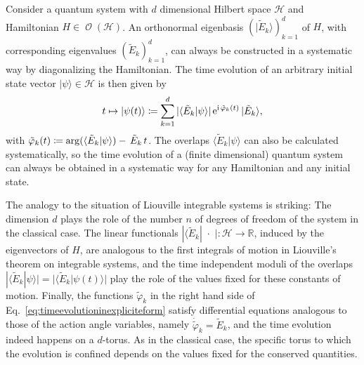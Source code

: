 \documentclass[a4paper,12pt,listof=totoc,index=totoc,bibliography=totoc,headsepline=false,headings=normal,BCOR16.153846mm,DIV12,headinclude,twoside,cleardoublepage=empty,numbers=noenddot,final]{scrreprt}
\theoremstyle{mystyle}
\numberwithin{equation}{section}
\numberwithin{figure}{section}
\numberwithin{lemma}{section}
\numberwithin{theorem}{section}
\numberwithin{corollary}{section}
\numberwithin{definition}{section}
\numberwithin{conjecture}{section}
\numberwithin{observation}{section}
\newcommand{\+}{\mkern2mu}
\newcommand{\coloneqq}{\mathrel{\vcentcolon\mkern-1.2mu=}} %
\newcommand{\texteqref}[1]{Eq.~\eqref{#1}}
\newcommand{\argdot}{{\,\cdot\,}}
\newcommand{\oftype}{\colon}
\renewcommand{\H}{H}
\newcommand{\bra}[1]{\langle #1|}
\newcommand{\ket}[1]{|#1\rangle}
\newcommand{\braket}[2]{\langle #1 | #2 \rangle}
\newcommand{\e}{\mathrm{e}}
\renewcommand{\i}{\mathrm{i}}
\DeclareMathOperator{\1}{\mathds{1}}
\DeclareMathOperator{\Obs}{\mathcal{O}}
\newcommand{\mc}[1]{\mathcal{#1}}
\newcommand{\mcH}{\mc{H}}
\newcommand{\mb}[1]{\mathbb{#1}}
\newcommand{\R}{\mb{R}}
\begin{document}
Consider a quantum system with $d$ dimensional Hilbert space $\mcH$ and Hamiltonian $\H \in \Obs(\mcH)$.
An orthonormal eigenbasis $(\ket{\tilde E_k})_{k=1}^d$ of $\H$, with corresponding eigenvalues $(\tilde E_k)_{k=1}^d$, can always be constructed in a systematic way by diagonalizing the Hamiltonian.
The time evolution of an arbitrary initial state vector $\ket \psi \in \mcH$ is then given by
\begin{equation}\label{eq:timeevolutioninexpliciteform}
  t \mapsto \ket{\psi(t)} \coloneqq \sum_{k=1}^d |\braket{\tilde E_k}{\psi}|\,\e^{\i\,\tilde\varphi_k(t)}\,\ket{\tilde E_k} ,
\end{equation}
with $\tilde\varphi_k(t) \coloneqq \arg(\braket{\tilde E_k}{\psi})-\,\tilde E_k\,t$.
The overlaps $\braket{\tilde E_k}{\psi}$ can also be calculated systematically, so the time evolution of a (finite dimensional) quantum system can always be obtained in a systematic way for any Hamiltonian and any initial state.

The analogy to the situation of Liouville integrable systems is striking:
The dimension $d$ plays the role of the number $n$ of degrees of freedom of the system in the classical case.
The linear functionals $|\bra{\tilde E_k} \,\argdot\, | \oftype \mcH \to \R$, induced by the eigenvectors of $\H$, are analogous to the first integrals of motion in Liouville's theorem on integrable systems, and the time independent moduli of the overlaps $|\braket{\tilde E_k}{\psi}| = |\braket{\tilde E_k}{\psi(t)}|$ play the role of the values fixed for these constants of motion.
Finally, the functions $\tilde \varphi_k$ in the right hand side of \texteqref{eq:timeevolutioninexpliciteform} satisfy differential equations analogous to those of the action angle variables, namely $\dot{\tilde{\varphi}}_k = \tilde E_k$, and the time evolution indeed happens on a $d$-torus.
As in the classical case, the specific torus to which the evolution is confined depends on the values fixed for the conserved quantities.
\end{document}
